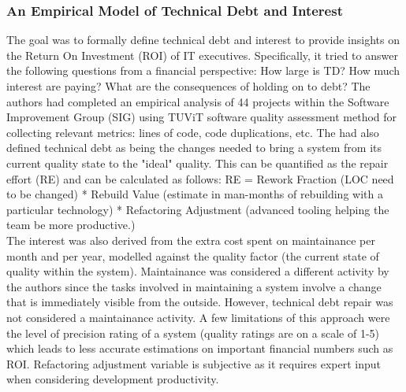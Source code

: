 \documentclass{mprop}
\begin{document}
\subsubsection{An Empirical Model of Technical Debt and Interest}
\cite{Nugroho2011} The goal was to formally define technical debt and interest
to provide insights on the Return On Investment (ROI) of IT executives.
Specifically, it tried to answer the following questions from a financial
perspective: How large is TD? How much interest are paying? What are the
consequences of holding on to debt? The authors had completed an empirical
analysis of 44 projects within the Software Improvement Group (SIG) using TUViT
software quality assessment method for collecting relevant metrics: lines of
code, code duplications, etc. The had also defined technical debt as being the
changes needed to bring a system from its current quality state to the "ideal"
quality. This can be quantified as the repair effort (RE) and can be calculated
as follows: RE = Rework Fraction (LOC need to be changed) * Rebuild Value
(estimate in man-months of rebuilding with a particular technology) *
Refactoring Adjustment (advanced tooling helping the team be more productive.)\\
The interest was also derived from the extra cost spent on maintainance per
month and per year, modelled against the quality factor (the current state of
quality within the system). Maintainance was considered a different activity by
the authors since the tasks involved in maintaining a system involve a change
that is immediately visible from the outside. However, technical debt repair was
not considered a maintainance activity. A few limitations of this approach were
the level of precision rating of a system (quality ratings are on a scale of
1-5) which leads to less accurate estimations on important financial numbers
such as ROI. Refactoring adjustment variable is subjective as it requires expert
input when considering development productivity.
\end{document}
